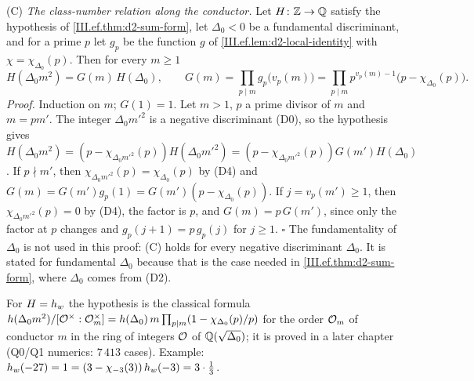 \label{fact:ef-C}(C) \emph{The class-number relation along the conductor.} Let $H\colon\mathbb{Z}\to\mathbb{Q}$ satisfy the hypothesis of
\cref{III.ef.thm:d2-sum-form}, let $\Delta_0<0$ be a fundamental discriminant, and for a prime $p$ let $g_p$ be the function $g$ of
\cref{III.ef.lem:d2-local-identity} with $\chi=\chi_{\Delta_0}(p)$. Then for every $m\ge1$
\[
  H(\Delta_0m^2)=G(m)\,H(\Delta_0),\qquad G(m)=\prod_{p\mid m}g_p\bigl(v_p(m)\bigr)=\prod_{p\mid m}p^{v_p(m)-1}\bigl(p-\chi_{\Delta_0}(p)\bigr).
\]
\emph{Proof.} Induction on $m$; $G(1)=1$. Let $m>1$, $p$ a prime divisor of $m$ and $m=pm'$. The integer $\Delta_0m'^2$ is a negative discriminant
(D0), so the hypothesis gives $H(\Delta_0m^2)=(p-\chi_{\Delta_0m'^2}(p))H(\Delta_0m'^2)=(p-\chi_{\Delta_0m'^2}(p))G(m')H(\Delta_0)$. If $p\nmid m'$, then
$\chi_{\Delta_0m'^2}(p)=\chi_{\Delta_0}(p)$ by (D4) and $G(m)=G(m')g_p(1)=G(m')(p-\chi_{\Delta_0}(p))$. If $j=v_p(m')\ge1$, then
$\chi_{\Delta_0m'^2}(p)=0$ by (D4), the factor is $p$, and $G(m)=p\,G(m')$, since only the factor at $p$ changes and $g_p(j+1)=p\,g_p(j)$ for $j\ge1$. $\square$
The fundamentality of $\Delta_0$ is not used in this proof: (C) holds for every negative discriminant $\Delta_0$. It is stated for fundamental
$\Delta_0$ because that is the case needed in \cref{III.ef.thm:d2-sum-form}, where $\Delta_0$ comes from (D2).

\noindent For $H=h_w$ the hypothesis is the classical formula $h(\Delta_0m^2)/[\mathcal{O}^\times:\mathcal{O}_m^\times]=h(\Delta_0)\,m\prod_{p\mid m}(1-\chi_{\Delta_0}(p)/p)$
for the order $\mathcal{O}_m$ of conductor $m$ in the ring of integers $\mathcal{O}$ of $\mathbb{Q}(\sqrt{\Delta_0})$; it is proved in a later chapter (Q0/Q1 numerics:
$7\,413$ cases). Example: $h_w(-27)=1=(3-\chi_{-3}(3))\,h_w(-3)=3\cdot\frac13$.

